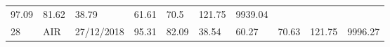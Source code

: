 \documentclass[
  11pt,
]{article}
\begin{document}
\begin{longtable}[]{@{}llllllllll@{}}
\begin{minipage}[t]{0.07\columnwidth}
97.09\strut
\end{minipage} & \begin{minipage}[t]{0.07\columnwidth}\raggedright
81.62\strut
\end{minipage} & \begin{minipage}[t]{0.07\columnwidth}\raggedright
38.79\strut
\end{minipage} & \begin{minipage}[t]{0.07\columnwidth}\raggedright
61.61\strut
\end{minipage} & \begin{minipage}[t]{0.07\columnwidth}\raggedright
70.5\strut
\end{minipage} & \begin{minipage}[t]{0.08\columnwidth}\raggedright
121.75\strut
\end{minipage} & \begin{minipage}[t]{0.09\columnwidth}\raggedright
9939.04\strut
\end{minipage}\tabularnewline
\begin{minipage}[t]{0.05\columnwidth}\raggedright
28\strut
\end{minipage} & \begin{minipage}[t]{0.07\columnwidth}\raggedright
AIR\strut
\end{minipage} & \begin{minipage}[t]{0.11\columnwidth}\raggedright
27/12/2018\strut
\end{minipage} & \begin{minipage}[t]{0.07\columnwidth}\raggedright
95.31\strut
\end{minipage} & \begin{minipage}[t]{0.07\columnwidth}\raggedright
82.09\strut
\end{minipage} & \begin{minipage}[t]{0.07\columnwidth}\raggedright
38.54\strut
\end{minipage} & \begin{minipage}[t]{0.07\columnwidth}\raggedright
60.27\strut
\end{minipage} & \begin{minipage}[t]{0.07\columnwidth}\raggedright
70.63\strut
\end{minipage} & \begin{minipage}[t]{0.08\columnwidth}\raggedright
121.75\strut
\end{minipage} & \begin{minipage}[t]{0.09\columnwidth}\raggedright
9996.27\strut
\end{minipage}\tabularnewline

\end{longtable}
\end{document}
